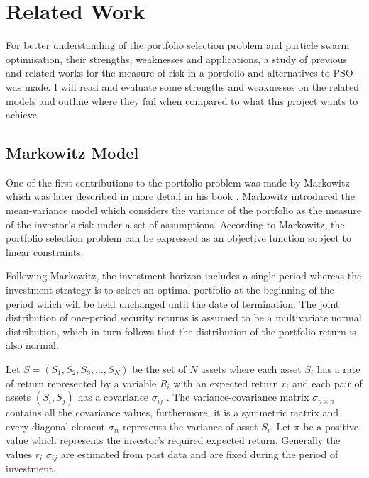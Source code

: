 \chapter{Related Work}
For better understanding of the portfolio selection problem and particle swarm optimisation, their strengths, weaknesses and applications, a study of previous and related works for the measure of risk in a portfolio and alternatives to PSO was made. I will read and evaluate some strengths and weaknesses on the related models and outline where they fail when compared to what this project wants to achieve. 

  \section{Markowitz Model} %
  \label{sec:markowitz_model}
    One of the first contributions to the portfolio problem was made by Markowitz \cite{marko1} which was later described in more detail in his book \cite{marko2}. Markowitz introduced the mean-variance model which considers the variance of the portfolio as the measure of the investor's risk under a set of assumptions. According to Markowitz, the portfolio selection problem can be expressed as an objective function subject to linear constraints. 

    Following Markowitz, the investment horizon includes a single period whereas the investment strategy is to select an optimal portfolio at the beginning of the period which will be held unchanged until the date of termination. The joint distribution of one-period security returns is assumed to be a multivariate normal distribution, which in turn follows that the distribution of the portfolio return is also normal. 

    Let $S = (S_1,S_2,S_3, \dots , S_N)$ be the set of $N$ assets where each asset $S_i$ has a rate of return represented by a variable $R_i$ with an expected return $r_i$ and each pair of assets $(S_i,S_j)$ has a covariance $\sigma_{ij}$ . The variance-covariance matrix $\sigma_{n\times n}$ contains all the covariance values, furthermore, it is a symmetric matrix and every diagonal element $\sigma_{ii}$ represents the variance of asset $S_i$. Let $\pi$ be a positive value which represents the investor's required expected return. Generally the values $r_i$ $\sigma_{ij}$ are estimated from past data and are fixed during the period of investment. 

